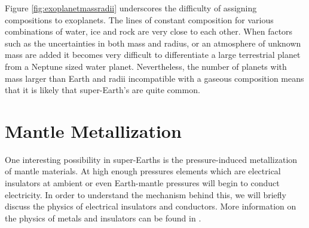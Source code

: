 Figure \ref{fig:exoplanetmassradii} underscores the difficulty of assigning compositions to exoplanets. The lines of constant composition for various combinations of water, ice and rock are very close to each other. When factors such as the uncertainties in both mass and radius, or an atmosphere of unknown mass \citep{adams2008} are added it becomes very difficult to differentiate a large terrestrial planet from a Neptune sized water planet. Nevertheless, the number of planets with mass larger than Earth and radii incompatible with a gaseous composition means that it is likely that super-Earth's are quite common.

\section{Mantle Metallization}
One interesting possibility in super-Earths is the pressure-induced metallization of mantle materials. At high enough pressures elements which are electrical insulators at ambient or even Earth-mantle pressures will begin to conduct electricity. In order to understand the mechanism behind this, we will briefly discuss the physics of electrical insulators and conductors. More information on the physics of metals and insulators can be found in \citet{ashcroftandmermin}.

